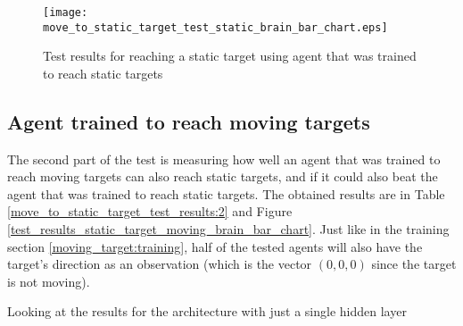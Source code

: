 \begin{figure}
    \begin{center}
        \texttt{[image: move\_to\_static\_target\_test\_static\_brain\_bar\_chart.eps]}
        \caption{Test results for reaching a static target using agent that was trained to reach static targets}
        \label{test_results_static_target_static_brain_bar_chart}
    \end{center}
\end{figure}


\subsection{Agent trained to reach moving targets}

The second part of the test is measuring how well an agent that was trained to reach moving targets can also reach static targets, and if it could also beat the agent that was trained to reach static targets. The obtained results are in Table \ref{move_to_static_target_test_results:2} and Figure \ref{test_results_static_target_moving_brain_bar_chart}. Just like in the training section \ref{moving_target:training}, half of the tested agents will also have the target's direction as an observation (which is the vector $(0, 0, 0)$ since the target is not moving).

Looking at the results for the architecture with just a single hidden layer

